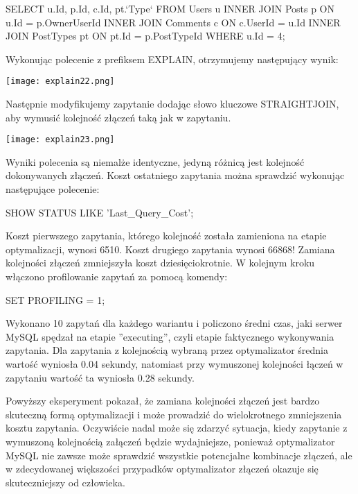 \begin{spverbatim}
	SELECT u.Id, p.Id, c.Id, pt.`Type` FROM Users u INNER JOIN Posts p ON u.Id = p.OwnerUserId	INNER JOIN Comments c ON c.UserId = u.Id INNER JOIN PostTypes pt ON pt.Id = p.PostTypeId WHERE u.Id = 4;
\end{spverbatim}

Wykonując polecenie z prefiksem EXPLAIN, otrzymujemy następujący wynik:
\begin{center}
	\texttt{[image: explain22.png]} 
\end{center}
Następnie modyfikujemy zapytanie dodając słowo kluczowe STRAIGHT\textunderscore JOIN, aby wymusić kolejność złączeń taką jak w zapytaniu.
\begin{center}
	\texttt{[image: explain23.png]} 
\end{center}
Wyniki polecenia są niemalże identyczne, jedyną różnicą jest kolejność dokonywanych złączeń. Koszt ostatniego zapytania można sprawdzić wykonując następujące polecenie:
\begin{spverbatim}
	SHOW STATUS LIKE 'Last_Query_Cost';
\end{spverbatim}
Koszt pierwszego zapytania, którego kolejność została zamieniona na etapie optymalizacji, wynosi 6510. Koszt drugiego zapytania wynosi 66868! Zamiana kolejności złączeń zmniejszyła koszt dziesięciokrotnie.
W kolejnym kroku włączono profilowanie zapytań za pomocą komendy:
\begin{spverbatim}
	SET PROFILING = 1;
\end{spverbatim}
Wykonano 10 zapytań dla każdego wariantu i policzono średni czas, jaki serwer MySQL spędzał na etapie ''executing'', czyli etapie faktycznego wykonywania zapytania. Dla zapytania z kolejnością wybraną przez optymalizator średnia wartość wyniosła 0.04 sekundy, natomiast przy wymuszonej kolejności łączeń w zapytaniu wartość ta wyniosła 0.28 sekundy. 

Powyższy eksperyment pokazał, że zamiana kolejności złączeń jest bardzo skuteczną formą optymalizacji i może prowadzić do wielokrotnego zmniejszenia kosztu zapytania. Oczywiście nadal może się zdarzyć sytuacja, kiedy zapytanie z wymuszoną kolejnością załączeń będzie wydajniejsze, ponieważ optymalizator MySQL nie zawsze może sprawdzić wszystkie potencjalne kombinacje złączeń, ale w zdecydowanej większości przypadków optymalizator złączeń okazuje się skuteczniejszy od człowieka.

